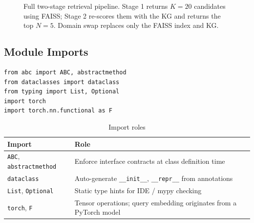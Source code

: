 \documentclass[12pt,a4paper]{article}
\theoremstyle{definition}
\theoremstyle{remark}
\begin{document}
\begin{figure}[H]
\caption{Full two-stage retrieval pipeline. Stage 1 returns $K=20$ candidates
using FAISS; Stage 2 re-scores them with the KG and returns the top $N=5$.
Domain swap replaces only the FAISS index and KG.}
\label{fig:pipeline}
\end{figure}

\subsection{Module Imports}

\begin{lstlisting}[caption={Module imports}]
from abc import ABC, abstractmethod
from dataclasses import dataclass
from typing import List, Optional
import torch
import torch.nn.functional as F
\end{lstlisting}

\begin{table}[H]
\centering
\caption{Import roles}
\begin{tabularx}{\textwidth}{lX}
\toprule
Import & Role \\
\midrule
\texttt{ABC}, \texttt{abstractmethod} & Enforce interface contracts at class definition time \\
\texttt{dataclass} & Auto-generate \texttt{\_\_init\_\_}, \texttt{\_\_repr\_\_} from annotations \\
\texttt{List}, \texttt{Optional} & Static type hints for IDE / mypy checking \\
\texttt{torch}, \texttt{F} & Tensor operations; query embedding originates from a PyTorch model \\
\bottomrule
\end{tabularx}
\end{table}
\end{document}
